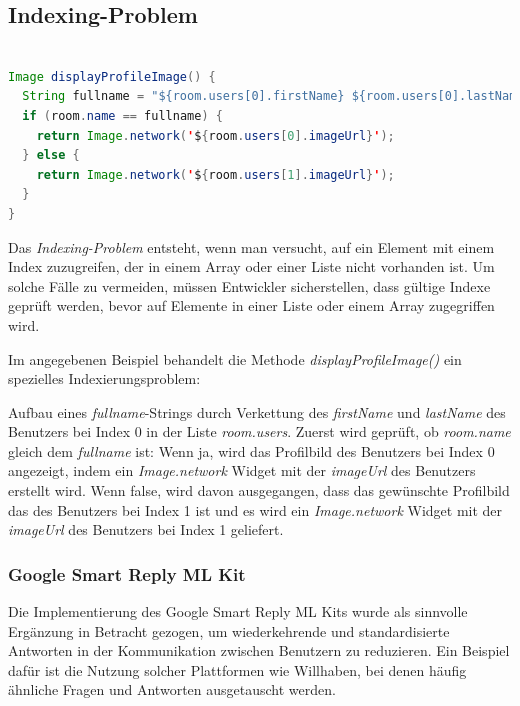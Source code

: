 \subsection{Indexing-Problem}

\begin{lstlisting}[language=Java,caption=Anzeige des Profilbildes,label=lst:fotoSelektion]  

Image displayProfileImage() {
  String fullname = "${room.users[0].firstName} ${room.users[0].lastName}";
  if (room.name == fullname) {
    return Image.network('${room.users[0].imageUrl}');
  } else {
    return Image.network('${room.users[1].imageUrl}');
  }
}

\end{lstlisting}

Das \textit{Indexing-Problem} entsteht, wenn man versucht, auf ein Element mit einem Index zuzugreifen, der in einem Array oder einer Liste nicht vorhanden ist. Um solche Fälle zu vermeiden, müssen Entwickler sicherstellen, dass gültige Indexe geprüft werden, bevor auf Elemente in einer Liste oder einem Array zugegriffen wird.

Im angegebenen Beispiel behandelt die Methode \textit{displayProfileImage()} ein spezielles Indexierungsproblem:

Aufbau eines \textit{fullname}-Strings durch Verkettung des \textit{firstName} und \textit{lastName} des Benutzers bei Index 0 in der Liste \textit{room.users}.
Zuerst wird geprüft, ob \textit{room.name} gleich dem \textit{fullname} ist:
Wenn ja, wird das Profilbild des Benutzers bei Index 0 angezeigt, indem ein \textit{Image.network} Widget mit der \textit{imageUrl} des Benutzers erstellt wird.
Wenn false, wird davon ausgegangen, dass das gewünschte Profilbild das des Benutzers bei Index 1 ist und es wird ein \textit{Image.network} Widget mit der \textit{imageUrl} des Benutzers bei Index 1 geliefert.

\subsubsection{Google Smart Reply ML Kit}
Die Implementierung des Google Smart Reply ML Kits wurde als sinnvolle Ergänzung in Betracht gezogen, um wiederkehrende und standardisierte Antworten in der Kommunikation zwischen Benutzern zu reduzieren. Ein Beispiel dafür ist die Nutzung solcher Plattformen wie Willhaben, bei denen häufig ähnliche Fragen und Antworten ausgetauscht werden.

